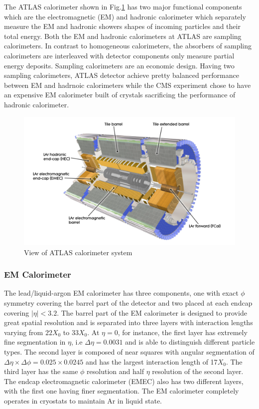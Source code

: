 \label{sec:detector-calo}

The ATLAS calorimeter shown in Fig.\ref{fig:detector-calo} has two major functional components which are the electromagnetic (EM) and hadronic calorimeter which separately measure the EM and hadronic showers shapes of incoming particles and their total energy. Both the EM and hadronic calorimeters at ATLAS are sampling calorimeters. In contrast to homogeneous calorimeters, the absorbers of sampling calorimeters are interleaved with detector components only measure partial energy deposits. Sampling calorimeters are an economic design. Having two sampling calorimeters, ATLAS detector achieve pretty balanced performance between EM and hadrnoic calorimeters while the CMS experiment chose to have an expensive EM calorimeter built of crystals sacrificing the performance of hadronic calorimeter. 


\begin{figure}[htpb!]
\begin{center}
  \includegraphics[width=0.9\linewidth]{figures/detector/calo}
\caption{View of ATLAS calorimeter system \cite{LARReadout}}
\label{fig:detector-calo}
\end{center}
\end{figure}

 
\subsubsection{EM Calorimeter}

The lead/liquid-argon EM calorimeter has three components\cite{ATLASDetector}, one with exact $\phi$ symmetry covering the barrel part of the detector and two placed at each endcap covering $|\eta|<3.2$. The barrel part of the EM calorimeter is designed to provide great spatial resolution and is separated into three layers with interaction lengths varying from $22X_0$ to $33X_0$. At $\eta =0$, for instance, the first layer has extremely fine segmentation in $\eta$, i.e $\Delta \eta = 0.0031$ and is able to distinguish different particle types. The second layer is composed of near squares with angular segmentation of $\Delta \eta \times \Delta \phi = 0.025 \times 0.0245$ and has the largest interaction length of 17$X_0$. The third layer has the same $\phi$ resolution and half $\eta$ resolution of the second layer. 
The endcap electromagnetic calorimeter (EMEC) also has two different layers, with the first one having finer segmentation. The EM calorimeter completely operates in cryostats to maintain Ar in liquid state.

